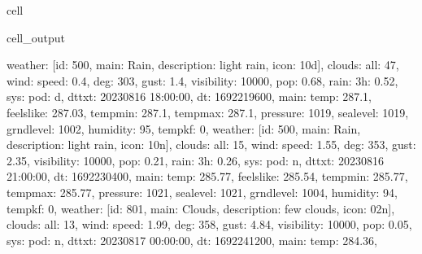 \documentclass[letterpaper,10pt,english]{jupyterBook}
\begin{document}
\begin{sphinxuseclass}{cell}
\begin{sphinxVerbatimOutput}
\begin{sphinxuseclass}{cell_output}
\begin{sphinxVerbatim}[commandchars=\\\{\}]
\PYGZsq{}weather\PYGZsq{}: [\PYGZob{}\PYGZsq{}id\PYGZsq{}: 500, \PYGZsq{}main\PYGZsq{}: \PYGZsq{}Rain\PYGZsq{}, \PYGZsq{}description\PYGZsq{}: \PYGZsq{}light rain\PYGZsq{}, \PYGZsq{}icon\PYGZsq{}: \PYGZsq{}10d\PYGZsq{}\PYGZcb{}], \PYGZsq{}clouds\PYGZsq{}: \PYGZob{}\PYGZsq{}all\PYGZsq{}: 47\PYGZcb{}, \PYGZsq{}wind\PYGZsq{}: \PYGZob{}\PYGZsq{}speed\PYGZsq{}: 0.4, \PYGZsq{}deg\PYGZsq{}: 303, \PYGZsq{}gust\PYGZsq{}: 1.4\PYGZcb{}, \PYGZsq{}visibility\PYGZsq{}: 10000, \PYGZsq{}pop\PYGZsq{}: 0.68, \PYGZsq{}rain\PYGZsq{}: \PYGZob{}\PYGZsq{}3h\PYGZsq{}: 0.52\PYGZcb{}, \PYGZsq{}sys\PYGZsq{}: \PYGZob{}\PYGZsq{}pod\PYGZsq{}: \PYGZsq{}d\PYGZsq{}\PYGZcb{}, \PYGZsq{}dt\PYGZus{}txt\PYGZsq{}: \PYGZsq{}2023\PYGZhy{}08\PYGZhy{}16 18:00:00\PYGZsq{}\PYGZcb{}, \PYGZob{}\PYGZsq{}dt\PYGZsq{}: 1692219600, \PYGZsq{}main\PYGZsq{}: \PYGZob{}\PYGZsq{}temp\PYGZsq{}: 287.1, \PYGZsq{}feels\PYGZus{}like\PYGZsq{}: 287.03, \PYGZsq{}temp\PYGZus{}min\PYGZsq{}: 287.1, \PYGZsq{}temp\PYGZus{}max\PYGZsq{}: 287.1, \PYGZsq{}pressure\PYGZsq{}: 1019, \PYGZsq{}sea\PYGZus{}level\PYGZsq{}: 1019, \PYGZsq{}grnd\PYGZus{}level\PYGZsq{}: 1002, \PYGZsq{}humidity\PYGZsq{}: 95, \PYGZsq{}temp\PYGZus{}kf\PYGZsq{}: 0\PYGZcb{}, \PYGZsq{}weather\PYGZsq{}: [\PYGZob{}\PYGZsq{}id\PYGZsq{}: 500, \PYGZsq{}main\PYGZsq{}: \PYGZsq{}Rain\PYGZsq{}, \PYGZsq{}description\PYGZsq{}: \PYGZsq{}light rain\PYGZsq{}, \PYGZsq{}icon\PYGZsq{}: \PYGZsq{}10n\PYGZsq{}\PYGZcb{}], \PYGZsq{}clouds\PYGZsq{}: \PYGZob{}\PYGZsq{}all\PYGZsq{}: 15\PYGZcb{}, \PYGZsq{}wind\PYGZsq{}: \PYGZob{}\PYGZsq{}speed\PYGZsq{}: 1.55, \PYGZsq{}deg\PYGZsq{}: 353, \PYGZsq{}gust\PYGZsq{}: 2.35\PYGZcb{}, \PYGZsq{}visibility\PYGZsq{}: 10000, \PYGZsq{}pop\PYGZsq{}: 0.21, \PYGZsq{}rain\PYGZsq{}: \PYGZob{}\PYGZsq{}3h\PYGZsq{}: 0.26\PYGZcb{}, \PYGZsq{}sys\PYGZsq{}: \PYGZob{}\PYGZsq{}pod\PYGZsq{}: \PYGZsq{}n\PYGZsq{}\PYGZcb{}, \PYGZsq{}dt\PYGZus{}txt\PYGZsq{}: \PYGZsq{}2023\PYGZhy{}08\PYGZhy{}16 21:00:00\PYGZsq{}\PYGZcb{}, \PYGZob{}\PYGZsq{}dt\PYGZsq{}: 1692230400, \PYGZsq{}main\PYGZsq{}: \PYGZob{}\PYGZsq{}temp\PYGZsq{}: 285.77, \PYGZsq{}feels\PYGZus{}like\PYGZsq{}: 285.54, \PYGZsq{}temp\PYGZus{}min\PYGZsq{}: 285.77, \PYGZsq{}temp\PYGZus{}max\PYGZsq{}: 285.77, \PYGZsq{}pressure\PYGZsq{}: 1021, \PYGZsq{}sea\PYGZus{}level\PYGZsq{}: 1021, \PYGZsq{}grnd\PYGZus{}level\PYGZsq{}: 1004, \PYGZsq{}humidity\PYGZsq{}: 94, \PYGZsq{}temp\PYGZus{}kf\PYGZsq{}: 0\PYGZcb{}, \PYGZsq{}weather\PYGZsq{}: [\PYGZob{}\PYGZsq{}id\PYGZsq{}: 801, \PYGZsq{}main\PYGZsq{}: \PYGZsq{}Clouds\PYGZsq{}, \PYGZsq{}description\PYGZsq{}: \PYGZsq{}few clouds\PYGZsq{}, \PYGZsq{}icon\PYGZsq{}: \PYGZsq{}02n\PYGZsq{}\PYGZcb{}], \PYGZsq{}clouds\PYGZsq{}: \PYGZob{}\PYGZsq{}all\PYGZsq{}: 13\PYGZcb{}, \PYGZsq{}wind\PYGZsq{}: \PYGZob{}\PYGZsq{}speed\PYGZsq{}: 1.99, \PYGZsq{}deg\PYGZsq{}: 358, \PYGZsq{}gust\PYGZsq{}: 4.84\PYGZcb{}, \PYGZsq{}visibility\PYGZsq{}: 10000, \PYGZsq{}pop\PYGZsq{}: 0.05, \PYGZsq{}sys\PYGZsq{}: \PYGZob{}\PYGZsq{}pod\PYGZsq{}: \PYGZsq{}n\PYGZsq{}\PYGZcb{}, \PYGZsq{}dt\PYGZus{}txt\PYGZsq{}: \PYGZsq{}2023\PYGZhy{}08\PYGZhy{}17 00:00:00\PYGZsq{}\PYGZcb{}, \PYGZob{}\PYGZsq{}dt\PYGZsq{}: 1692241200, \PYGZsq{}main\PYGZsq{}: \PYGZob{}\PYGZsq{}temp\PYGZsq{}: 284.36, 
\end{sphinxVerbatim}
\end{sphinxuseclass}
\end{sphinxVerbatimOutput}
\end{sphinxuseclass}
\end{document}
